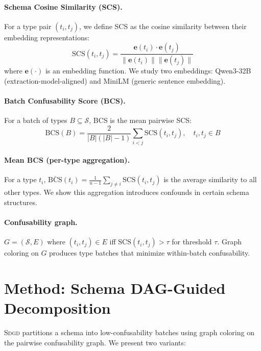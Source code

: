 \documentclass[11pt,a4paper]{article}
\newcommand{\sdgd}{\textsc{Sdgd}}
\begin{document}
\paragraph{Schema Cosine Similarity (SCS).}
For a type pair $(t_i, t_j)$, we define SCS as the cosine similarity between their embedding representations:
\begin{equation}
\text{SCS}(t_i, t_j) = \frac{\mathbf{e}(t_i) \cdot \mathbf{e}(t_j)}{\|\mathbf{e}(t_i)\| \|\mathbf{e}(t_j)\|}
\end{equation}
where $\mathbf{e}(\cdot)$ is an embedding function.
We study two embeddings: Qwen3-32B (extraction-model-aligned) and MiniLM (generic sentence embedding).

\paragraph{Batch Confusability Score (BCS).}
For a batch of types $B \subseteq \mathcal{S}$, BCS is the mean pairwise SCS:
\begin{equation}
\text{BCS}(B) = \frac{2}{|B|(|B|-1)} \sum_{i<j} \text{SCS}(t_i, t_j), \quad t_i,t_j \in B
\end{equation}

\paragraph{Mean BCS (per-type aggregation).}
For a type $t_i$, $\overline{\text{BCS}}(t_i) = \frac{1}{n-1}\sum_{j \neq i}\text{SCS}(t_i, t_j)$ is the average similarity to all other types. We show this aggregation introduces confounds in certain schema structures.

\paragraph{Confusability graph.}
$G = (\mathcal{S}, E)$ where $(t_i, t_j) \in E$ iff $\text{SCS}(t_i, t_j) > \tau$ for threshold $\tau$.
Graph coloring on $G$ produces type batches that minimize within-batch confusability.

\section{Method: Schema DAG-Guided Decomposition}
\label{sec:method}

\sdgd{} partitions a schema into low-confusability batches using graph coloring on the pairwise confusability graph.
We present two variants:
\end{document}
